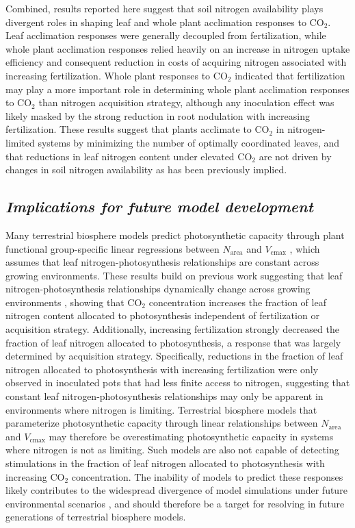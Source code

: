 Combined, results reported here suggest that soil nitrogen availability plays divergent roles in shaping leaf and whole plant acclimation responses to CO$_2$. Leaf acclimation responses were generally decoupled from fertilization, while whole plant acclimation responses relied heavily on an increase in nitrogen uptake efficiency and consequent reduction in costs of acquiring nitrogen associated with increasing fertilization. Whole plant responses to CO$_2$ indicated that fertilization may play a more important role in determining whole plant acclimation responses to CO$_2$ than nitrogen acquisition strategy, although any inoculation effect was likely masked by the strong reduction in root nodulation with increasing fertilization. These results suggest that plants acclimate to CO$_2$ in nitrogen-limited systems by minimizing the number of optimally coordinated leaves, and that reductions in leaf nitrogen content under elevated CO$_2$ are not driven by changes in soil nitrogen availability as has been previously implied.

\subsection{\textit{Implications for future model development}}
\noindent Many terrestrial biosphere models predict photosynthetic capacity through plant functional group-specific linear regressions between $N_\mathrm{area}$ and $V_\mathrm{cmax}$ , which assumes that leaf nitrogen-photosynthesis relationships are constant across growing environments. These results build on previous work suggesting that leaf nitrogen-photosynthesis relationships dynamically change across growing environments , showing that CO$_2$ concentration increases the fraction of leaf nitrogen content allocated to photosynthesis independent of fertilization or acquisition strategy. Additionally, increasing fertilization strongly decreased the fraction of leaf nitrogen allocated to photosynthesis, a response that was largely determined by acquisition strategy. Specifically, reductions in the fraction of leaf nitrogen allocated to photosynthesis with increasing fertilization were only observed in inoculated pots that had less finite access to nitrogen, suggesting that constant leaf nitrogen-photosynthesis relationships may only be apparent in environments where nitrogen is limiting. Terrestrial biosphere models that parameterize photosynthetic capacity through linear relationships between $N_\mathrm{area}$ and $V_\mathrm{cmax}$  may therefore be overestimating photosynthetic capacity in systems where nitrogen is not as limiting. Such models are also not capable of detecting stimulations in the fraction of leaf nitrogen allocated to photosynthesis with increasing CO$_2$ concentration. The inability of models to predict these responses likely contributes to the widespread divergence of model simulations under future environmental scenarios , and should therefore be a target for resolving in future generations of terrestrial biosphere models.

